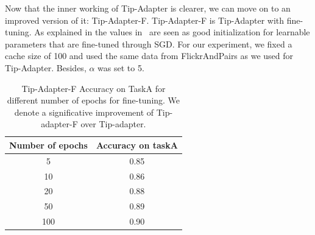 \documentclass[12pt,a4paper]{article}
\begin{document}
Now that the inner working of Tip-Adapter is clearer, we can move on to an improved version of it: Tip-Adapter-F. Tip-Adapter-F is Tip-Adapter with fine-tuning. As explained in \autocite*{zhangTipAdapterTrainingfreeAdaption2022} the values in \lt\ are seen as good initialization for learnable parameters that are fine-tuned through SGD. For our experiment, we fixed a cache size of 100 and used the same data from FlickrAndPairs as we used for Tip-Adapter. Besides, $\alpha$ was set to 5.

\begin{table}[H]
    \centering
    \begin{tabular}{|c|c|}
    \hline
    \textbf{Number of epochs} & \textbf{Accuracy on taskA} \\ \hline
    5   & 0.85 \\ \hline
    10  & 0.86 \\ \hline
    20  & 0.88 \\ \hline
    50  & 0.89 \\ \hline
    100 & 0.90 \\ \hline
    \end{tabular}
    \caption{Tip-Adapter-F Accuracy on TaskA for different number of epochs for fine-tuning. We denote a significative improvement of Tip-adapter-F over Tip-adapter.}
\end{table}
\end{document}
